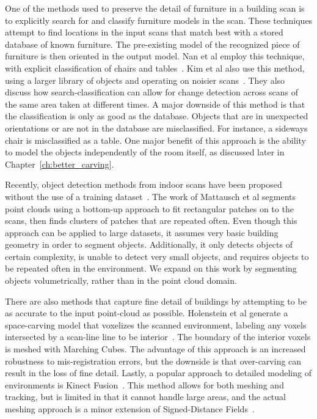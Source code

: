 \documentclass[12pt,onecolumn,oneside]{book}
\begin{document}
One of the methods used to preserve the detail of furniture in a building scan is to explicitly search for and classify furniture models in the scan.  These techniques attempt to find locations in the input scans that match best with a stored database of known furniture.  The pre-existing model of the recognized piece of furniture is then oriented in the output model.  Nan et al employ this technique, with explicit classification of chairs and tables~\cite{SearchClassifyPointcloud}.  Kim et al also use this method, using a larger library of objects and operating on noisier scans~\cite{Kim12}.  They also discuss how search-classification can allow for change detection across scans of the same area taken at different times.  A major downside of this method is that the classification is only as good as the database.  Objects that are in unexpected orientations or are not in the database are misclassified.  For instance, a sideways chair is misclassified as a table.  One major benefit of this approach is the ability to model the objects independently of the room itself, as discussed later in Chapter~\ref{ch:better_carving}.  

Recently, object detection methods from indoor scans have been proposed without the use of a training dataset~\cite{ObjectDiscovery13,Mattausch14}.  The work of Mattausch et al segments point clouds using a bottom-up approach to fit rectangular patches on to the scans, then finds clusters of patches that are repeated often.  Even though this approach can be applied to large datasets, it assumes very basic building geometry in order to segment objects.  Additionally, it only detects objects of certain complexity, is unable to detect very small objects, and requires objects to be repeated often in the environment.  We expand on this work by segmenting objects volumetrically, rather than in the point cloud domain.

There are also methods that capture fine detail of buildings by attempting to be as accurate to the input point-cloud as possible.  Holenstein et al generate a space-carving model that voxelizes the scanned environment, labeling any voxels intersected by a scan-line line to be interior~\cite{Carving}.  The boundary of the interior voxels is meshed with Marching Cubes.  The advantage of this approach is an increased robustness to mis-registration errors, but the downside is that over-carving can result in the loss of fine detail.  Lastly, a popular approach to detailed modeling of environments is Kinect Fusion~\cite{KinectFusion,Kintinuous}.  This method allows for both meshing and tracking, but is limited in that it cannot handle large areas, and the actual meshing approach is a minor extension of Signed-Distance Fields~\cite{SignedDistanceFields}. 
\end{document}
